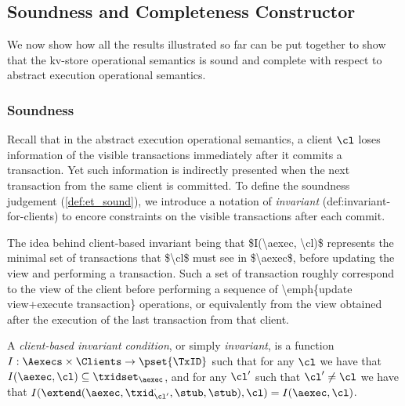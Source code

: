 \subsection{Soundness and Completeness Constructor}
\label{sec:kv2aexec-sound-complete}

We now show how all the results illustrated so far 
can be put together to show that the kv-store operational semantics 
is sound and complete with respect to abstract execution operational semantics.

\subsubsection{Soundness}
Recall that in the abstract execution operational semantics,
a client \( \cl \) loses information of the visible transactions immediately after it commits a transaction.
Yet such information is indirectly presented when the next transaction from the same client is committed.
To define the soundness judgement (\cref{def:et_sound}), we introduce a notation of \emph{invariant} ({def:invariant-for-clients})
to encore constraints on the visible transactions after each commit.

\ac{The idea behind client-based invariant being that $I(\aexec, \cl)$ represents 
the minimal set of transactions that $\cl$ must see in $\aexec$, before 
updating the view and performing a transaction. Such a set of transaction 
roughly correspond to the view of the client before performing a 
sequence of \emph{update view+execute transaction} operations, 
or equivalently from the view obtained after the execution of the 
last transaction from that client.}

\begin{definition}
\label{def:invariant-for-clients}
A \emph{client-based invariant condition}, or simply \emph{invariant}, is a 
function $I : \Aexecs \times \Clients \rightarrow \pset{\TxID}$ 
such that for any $\cl$ we have that $I(\aexec, \cl) \subseteq \txidset_{\aexec}$, and 
for any  $\cl'$ such that $\cl' \neq \cl$ we have that 
$I(\extend(\aexec, \txid_{\cl'}^{\cdot}, \stub, \stub), \cl) = I(\aexec, \cl)$.
\end{definition}



